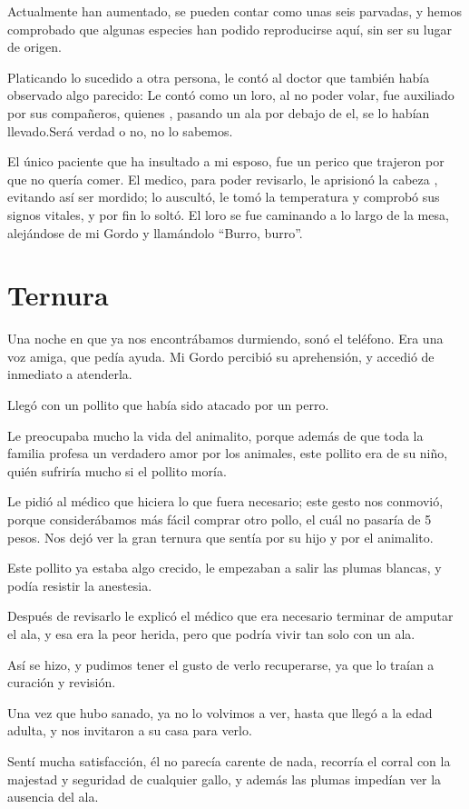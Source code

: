 \documentclass[letterpaper, 12pt]{book}
\begin{document}
Actualmente han aumentado, se pueden contar como unas seis parvadas, y hemos comprobado que algunas especies han podido reproducirse aquí, sin ser su lugar de origen.

Platicando lo sucedido a otra persona, le contó al doctor que también había observado algo parecido: Le contó como un loro, al no poder volar, fue auxiliado por sus compañeros, quienes , pasando un ala por debajo de el, se lo habían llevado.Será verdad o no, no lo sabemos.

El único paciente que ha insultado a mi esposo, fue un perico que trajeron por que no quería comer. El medico, para poder revisarlo, le aprisionó la cabeza , evitando así ser mordido; lo auscultó, le tomó la temperatura y comprobó sus signos vitales, y por fin lo soltó. El loro se fue caminando a lo largo de la mesa, alejándose de mi Gordo y llamándolo ``Burro, burro''.


\chapter{Ternura}
Una noche en que ya nos encontrábamos durmiendo, sonó el teléfono. Era una voz amiga, que pedía ayuda. Mi Gordo percibió su aprehensión, y accedió de inmediato a atenderla. 

Llegó con un pollito que había sido atacado por un perro.

Le preocupaba mucho la vida del animalito, porque además de que toda la familia profesa un verdadero amor por los animales, este pollito era de su niño, quién sufriría mucho si el pollito moría. 

Le pidió al médico que hiciera lo que fuera necesario; este gesto nos conmovió, porque considerábamos más fácil comprar otro pollo, el cuál no pasaría de 5 pesos. Nos dejó ver la gran ternura que sentía por su hijo y por el animalito.

Este pollito ya estaba algo crecido, le empezaban a salir las plumas blancas, y podía resistir la anestesia. 

Después de revisarlo le explicó el médico que era necesario terminar de amputar el ala, y esa era la peor herida, pero que podría vivir tan solo con un ala.

Así se hizo, y pudimos tener el gusto de verlo recuperarse, ya que lo traían a curación y revisión. 

Una vez que hubo sanado, ya no lo volvimos a ver, hasta que llegó a la edad adulta, y nos invitaron a su casa para verlo.

Sentí mucha satisfacción, él no parecía carente de nada, recorría el corral con la majestad y seguridad de cualquier gallo, y además las plumas impedían ver la ausencia del ala.
\end{document}
